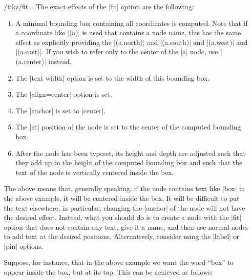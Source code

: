 \begin{key}{/tikz/fit=}
    The exact effects of the |fit| option are the following:
    \begin{enumerate}
        \item A minimal bounding box containing all coordinates is computed.
            Note that if a coordinate like |(a)| is used that contains a node
            name, this has the same effect as explicitly providing the
            |(a.north)| and |(a.south)| and |(a.west)| and |(a.east)|. If you
            wish to refer only to the center of the |a| node, use  |(a.center)|
            instead.
        \item The |text width| option is set to the width of this bounding box.
        \item The |align=center| option is set.
        \item The |anchor| is set to |center|.
        \item The |at| position of the node is set to the center of the
            computed bounding box.
        \item After the node has been typeset, its height and depth are
            adjusted such that they add up to the height of the computed
            bounding box and such that the text of the node is vertically
            centered inside the box.
    \end{enumerate}
    The above means that, generally speaking, if the node contains text like
    |box| in the above example, it will be centered inside the box. It will be
    difficult to put the text elsewhere, in particular, changing the |anchor|
    of the node will not have the desired effect. Instead, what you should do
    is to create a node with the |fit| option that does not contain any text,
    give it a name, and then use normal nodes to add text at the desired
    positions. Alternatively, consider using the |label| or |pin| options.

    Suppose, for instance, that in the above example we want the word ``box''
    to appear inside the box, but at its top. This can be achieved as follows:
\begin{codeexample}[]
\end{codeexample}


\end{key}
